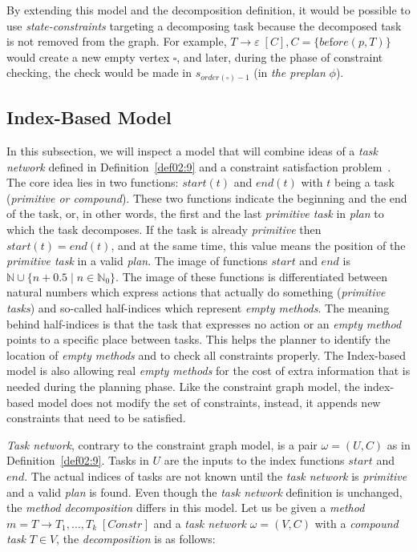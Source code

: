 \medskip\noindent
By extending this model and the decomposition definition, it would be possible to use \emph{state-constraints} targeting a decomposing task because the decomposed task is not removed from the graph. For example, $T \rightarrow \varepsilon \; [C], C = \{be\text{f}ore(p, T)\}$ would create a new empty vertex $\square$, and later, during the phase of constraint checking, the check would be made in $s_{order(\square) - 1}$ (in \emph{the preplan} $\phi$).

\subsection{Index-Based Model}

\medskip\noindent
In this subsection, we will inspect a model that will combine ideas of a \emph{task network} defined in Definition~\ref{def02:9} and a constraint satisfaction problem~\cite{ondrckova2023semantics}. The core idea lies in two functions: $start(t)$ and $end(t)$ with $t$ being a task (\emph{primitive or compound}). These two functions indicate the beginning and the end of the task, or, in other words, the first and the last \emph{primitive task} in \emph{plan} to which the task decomposes. If the task is already \emph{primitive} then $start(t) = end(t)$, and at the same time, this value means the position of the \emph{primitive task} in a valid \emph{plan}. The image of functions $start$ and $end$ is $\mathbb{N} \cup \{n + 0.5 \; | \; n \in \mathbb{N}_0\}$. The image of these functions is differentiated between natural numbers which express actions that actually do something (\emph{primitive tasks}) and so-called half-indices which represent \emph{empty methods}. The meaning behind half-indices is that the task that expresses no action or an \emph{empty method} points to a specific place between tasks. This helps the planner to identify the location of \emph{empty methods} and to check all constraints properly. The Index-based model is also allowing real \emph{empty methods} for the cost of extra information that is needed during the planning phase. Like the constraint graph model, the index-based model does not modify the set of constraints, instead, it appends new constraints that need to be satisfied.

\medskip\noindent
\emph{Task network}, contrary to the constraint graph model, is a pair $\omega = (U, C)$ as in Definition~\ref{def02:9}. Tasks in $U$ are the inputs to the index functions $start$ and $end$. The actual indices of tasks are not known until the \emph{task network} is \emph{primitive} and a valid \emph{plan} is found. Even though the \emph{task network} definition is unchanged, the \emph{method decomposition} differs in this model. Let us be given a \emph{method} $m = T \rightarrow T_1, \dots, T_k \; [Constr]$ and a \emph{task network} $\omega = (V, C)$ with a \emph{compound task} $T \in V$, the \emph{decomposition} is as follows:

